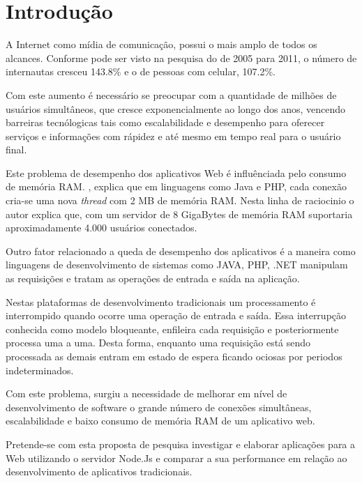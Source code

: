 \chapter{Introdução}
\label{introducao}

\vspace{-1.9cm}

  
  A Internet como mídia de comunicação, possui o mais amplo de todos os alcances. 
  Conforme pode ser visto na pesquisa do  de 2005 para 2011, 
  o número de internautas cresceu 143.8\%  e o de pessoas com celular, 107.2\%.
  
  Com este aumento é necessário se preocupar com a quantidade de milhões de usuários simultâneos,
  que cresce exponencialmente ao longo dos anos, vencendo barreiras tecnólogicas tais como 
  escalabilidade e desempenho para oferecer serviços e informações com rápidez e até mesmo em tempo
  real para o usuário final.
  
  Este problema de desempenho dos aplicativos Web é influênciada pelo consumo de memória RAM. , explica que 
  em linguagens como Java e PHP, cada conexão cria-se uma nova \textit{thread} com 2 MB de memória RAM. Nesta linha 
  de raciocinio o autor explica que, com um servidor de 8 GigaBytes de memória RAM suportaria aproximadamente 4.000 usuários
  conectados.
  
  Outro fator relacionado a queda de desempenho dos aplicativos é a maneira como linguagens de desenvolvimento de sistemas como JAVA, PHP,
  .NET manipulam as requisições e tratam as operações de entrada e saída na aplicação. 
  
  Nestas plataformas de desenvolvimento tradicionais um processamento é interrompido quando ocorre uma operação de entrada e saída.
  Essa interrupção conhecida como modelo bloqueante, enfileira cada requisição e posteriormente processa uma a uma. Desta forma, 
  enquanto uma requisição está sendo processada as demais entram em estado de espera ficando ociosas
  por periodos indeterminados.\cite{Pereira:2013}
  
  Com este problema, surgiu a necessidade de melhorar em nível de desenvolvimento de software o grande número de conexões 
  simultâneas, escalabilidade e baixo consumo de memória RAM de um aplicativo web.\cite{Oliveira:2012}
  
  Pretende-se com esta proposta de pesquisa investigar e elaborar aplicações para a Web 
  utilizando o servidor Node.Js e comparar a sua performance em relação ao desenvolvimento
  de aplicativos tradicionais.
  
